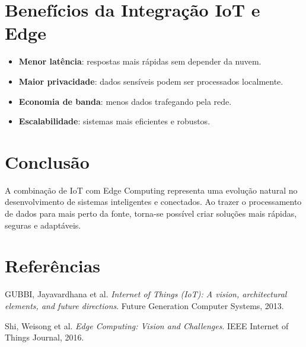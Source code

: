 \documentclass[12pt]{article}
\begin{document}
\section{Benefícios da Integração IoT e Edge}
\begin{itemize}
    \item \textbf{Menor latência}: respostas mais rápidas sem depender da nuvem.
    \item \textbf{Maior privacidade}: dados sensíveis podem ser processados localmente.
    \item \textbf{Economia de banda}: menos dados trafegando pela rede.
    \item \textbf{Escalabilidade}: sistemas mais eficientes e robustos.
\end{itemize}

\section{Conclusão}
A combinação de IoT com Edge Computing representa uma evolução natural no desenvolvimento de sistemas inteligentes e conectados. Ao trazer o processamento de dados para mais perto da fonte, torna-se possível criar soluções mais rápidas, seguras e adaptáveis.

\section*{Referências}
\begin{thebibliography}{9}

GUBBI, Jayavardhana et al. \textit{Internet of Things (IoT): A vision, architectural elements, and future directions}. Future Generation Computer Systems, 2013.

Shi, Weisong et al. \textit{Edge Computing: Vision and Challenges}. IEEE Internet of Things Journal, 2016.

\end{thebibliography}
\end{document}
